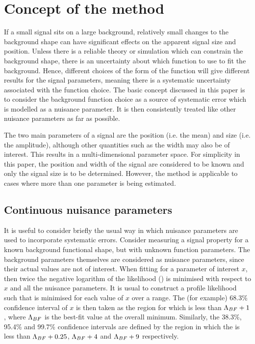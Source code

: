 \section{Concept of the method} %
\label{sec:concept}

If a small signal sits on
a large background, relatively small changes to the background shape can
have significant effects on the apparent signal size and position.
Unless there is a
reliable theory or simulation which can constrain the background shape,
there is an uncertainty about which function to use to fit
the background. Hence, different choices of the form of the function
will give different results for the signal parameters, meaning there is a
systematic uncertainty associated with the function choice.
The basic concept discussed in this paper is to consider the background
function choice as a source of systematic error which is modelled as a nuisance parameter.
It is then consistently treated like other nuisance parameters as far as
possible.

The two main parameters of a signal are the position (i.e. the mean)
and size (i.e. the amplitude), although other
quantities such as the width may also be of interest. This results in a
multi-dimensional parameter space. For simplicity in this paper, the position
and width of the signal are considered to be known and only the signal
size is to be determined. However, the method is applicable to
cases where more than one parameter is being estimated.

\subsection{Continuous nuisance parameters}
\label{sec:concept:continuous}

It is useful to consider briefly the usual way in which nuisance 
parameters are used to incorporate systematic errors. Consider measuring a signal
property for a known background functional shape, but with unknown function
parameters. The background parameters themselves are considered as
nuisance parameters, since their actual values are not of interest.
When fitting for a parameter of interest $x$, then twice the negative logarithm of the
likelihood (\nll) is minimised with respect to $x$ and all the
nuisance parameters. It is usual to construct a profile likelihood
such that \nll is minimised for each value of $x$ over a range. 
The (for example) 68.3\% confidence interval of $x$ 
is then
taken as the region for which \nll is less than ${\rm \Lambda}_{BF}+1$,
where ${\rm \Lambda}_{BF}$ is the best-fit value at the overall minimum. 
Similarly, the 38.3\%, 95.4\% and 99.7\% confidence intervals are defined by the 
region in which the \nll is less than ${\rm \Lambda}_{BF}+0.25$, ${\rm \Lambda}_{BF}+4$ 
and ${\rm \Lambda}_{BF}+9$ respectively. 

